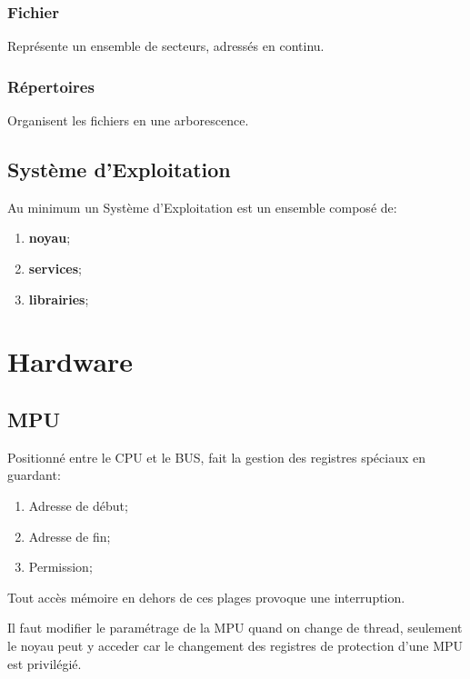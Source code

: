 \documentclass{article}
\begin{document}
\subsubsection{Fichier}
\begin{definition}
    Représente un ensemble de secteurs, adressés en continu. 
\end{definition}

\subsubsection{Répertoires}
\begin{definition}
    Organisent les fichiers en une arborescence.
\end{definition}


\subsection{Système d'Exploitation}
\begin{definition}
    Au minimum un Système d'Exploitation est un ensemble composé de:
    \begin{enumerate}[noitemsep]
        \item \textbf{noyau};
        \item \textbf{services};
        \item \textbf{librairies};
    \end{enumerate}
\end{definition}



\section{Hardware}
\subsection{MPU}
\begin{definition}
    Positionné entre le CPU et le BUS, fait la gestion des registres spéciaux en guardant:
    \begin{enumerate}[noitemsep]
        \item Adresse de début;
        \item Adresse de fin;
        \item Permission;
    \end{enumerate}
    Tout accès mémoire en dehors de ces plages provoque une interruption.

    \begin{remark}
        Il faut modifier le paramétrage de la MPU quand on change de thread, seulement le noyau peut y acceder car le changement des registres de protection d'une MPU est privilégié.
    \end{remark}
\end{definition}
\end{document}
